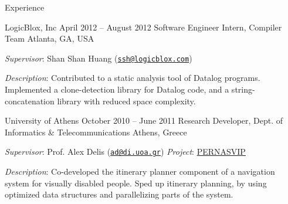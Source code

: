 \documentclass{resume}
\begin{document}
\begin{rSection}{Experience}

\begin{rSubsection}{LogicBlox, Inc}
  {April 2012 -- August 2012}
  {Software Engineer Intern, Compiler Team}
  {Atlanta, GA, USA}
\item \emph{Supervisor}: Shan Shan Huang
  (\href{mailto:ssh@logicblox.com}{\nolinkurl{ssh@logicblox.com}})
\item \emph{Description}: Contributed to a static analysis tool of
  Datalog programs. Implemented a clone-detection library for Datalog
  code, and a string-concatenation library with reduced space complexity.
\end{rSubsection}

\begin{rSubsection}
  {University of Athens}
  {October 2010 -- June 2011}
  {Research Developer, Dept. of Informatics \& Telecommunications}
  {Athens, Greece}
\item \emph{Supervisor}: Prof. Alex Delis
  (\href{mailto:ad@di.uoa.gr}{\nolinkurl{ad@di.uoa.gr}})
  \hfill{%
  \emph{Project}: \href{http://pernasvip.di.uoa.gr/index.php}{PERNASVIP}}
\item \emph{Description}: Co-developed the itinerary planner component
  of a navigation system for visually disabled people. Sped up
  itinerary planning, by using optimized data structures and
  parallelizing parts of the system.
\end{rSubsection}

\end{rSection}
\end{document}
